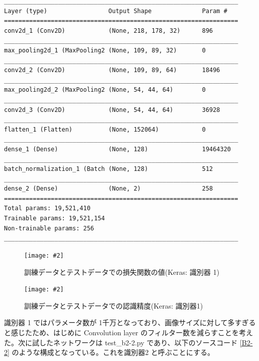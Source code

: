 \documentclass[a4paper,dvipdfmx]{jsarticle}
\newcommand{\image}[3]{
    \begin{figure}[H]
        \begin{center}
        \texttt{[image: \#2]}
        \end{center}
        \caption{#1}
        \label{#3}
    \end{figure}
}
\begin{document}
\begin{lstlisting}[caption="識別器 1 ",label=B2-1]
_________________________________________________________________
Layer (type)                 Output Shape              Param #
=================================================================
conv2d_1 (Conv2D)            (None, 218, 178, 32)      896
_________________________________________________________________
max_pooling2d_1 (MaxPooling2 (None, 109, 89, 32)       0
_________________________________________________________________
conv2d_2 (Conv2D)            (None, 109, 89, 64)       18496
_________________________________________________________________
max_pooling2d_2 (MaxPooling2 (None, 54, 44, 64)        0
_________________________________________________________________
conv2d_3 (Conv2D)            (None, 54, 44, 64)        36928
_________________________________________________________________
flatten_1 (Flatten)          (None, 152064)            0
_________________________________________________________________
dense_1 (Dense)              (None, 128)               19464320
_________________________________________________________________
batch_normalization_1 (Batch (None, 128)               512
_________________________________________________________________
dense_2 (Dense)              (None, 2)                 258
=================================================================
Total params: 19,521,410
Trainable params: 19,521,154
Non-trainable params: 256
_________________________________________________________________
\end{lstlisting}

\image{訓練データとテストデータでの損失関数の値(Keras: 識別器 1)}{report_b2-1.png}{fig-B2-1}
\image{訓練データとテストデータでの認識精度(Keras: 識別器1)}{report_b2-2.png}{fig-B2-2}


識別器 1 ではパラメータ数が 1千万となっており、画像サイズに対して多すぎると感じたため、はじめに Convolution layer のフィルター数を減らすことを考えた。次に試したネットワークは test\_b2-2.py であり、以下のソースコード \ref{B2-2} のような構成となっている。これを識別器2 と呼ぶことにする。
\end{document}
